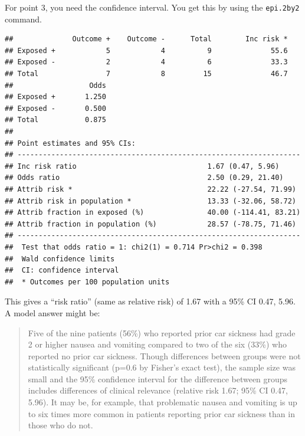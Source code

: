 \documentclass[]{book}
\newenvironment{Shaded}{\begin{snugshade}}{\end{snugshade}}
\newcommand{\DataTypeTok}[1]{\textcolor[rgb]{0.13,0.29,0.53}{#1}}
\newcommand{\DecValTok}[1]{\textcolor[rgb]{0.00,0.00,0.81}{#1}}
\newcommand{\KeywordTok}[1]{\textcolor[rgb]{0.13,0.29,0.53}{\textbf{#1}}}
\newcommand{\NormalTok}[1]{#1}
\newcommand{\OperatorTok}[1]{\textcolor[rgb]{0.81,0.36,0.00}{\textbf{#1}}}
\begin{document}
For point 3, you need the confidence interval. You get this by using the \texttt{epi.2by2} command.

\begin{Shaded}
\end{Shaded}

\begin{verbatim}
##              Outcome +    Outcome -      Total        Inc risk *
## Exposed +            5            4          9              55.6
## Exposed -            2            4          6              33.3
## Total                7            8         15              46.7
##                  Odds
## Exposed +       1.250
## Exposed -       0.500
## Total           0.875
## 
## Point estimates and 95% CIs:
## -------------------------------------------------------------------
## Inc risk ratio                               1.67 (0.47, 5.96)
## Odds ratio                                   2.50 (0.29, 21.40)
## Attrib risk *                                22.22 (-27.54, 71.99)
## Attrib risk in population *                  13.33 (-32.06, 58.72)
## Attrib fraction in exposed (%)               40.00 (-114.41, 83.21)
## Attrib fraction in population (%)            28.57 (-78.75, 71.46)
## -------------------------------------------------------------------
##  Test that odds ratio = 1: chi2(1) = 0.714 Pr>chi2 = 0.398
##  Wald confidence limits
##  CI: confidence interval
##  * Outcomes per 100 population units
\end{verbatim}

This gives a ``risk ratio'' (same as relative risk) of 1.67 with a 95\% CI 0.47, 5.96. A model answer might be:

\begin{quote}
Five of the nine patients (56\%) who reported prior car sickness had grade 2 or higher nausea and vomiting compared to two of the six (33\%) who reported no prior car sickness. Though differences between groups were not statistically significant (p=0.6 by Fisher's exact test), the sample size was small and the 95\% confidence interval for the difference between groups includes differences of clinical relevance (relative risk 1.67; 95\% CI 0.47, 5.96). It may be, for example, that problematic nausea and vomiting is up to six times more common in patients reporting prior car sickness than in those who do not.
\end{quote}
\end{document}
